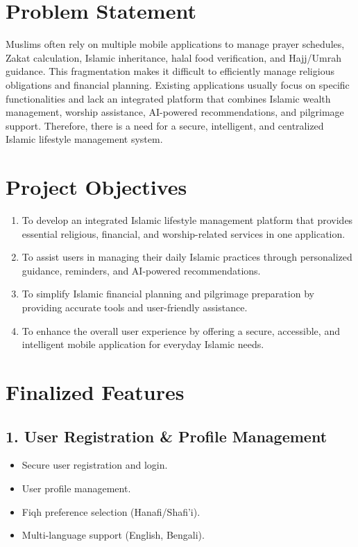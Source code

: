\documentclass[12pt,a4paper]{article}
\begin{document}
\tableofcontents
\newpage

\section{Problem Statement}

Muslims often rely on multiple mobile applications to manage prayer schedules, Zakat calculation, Islamic inheritance, halal food verification, and Hajj/Umrah guidance. This fragmentation makes it difficult to efficiently manage religious obligations and financial planning. Existing applications usually focus on specific functionalities and lack an integrated platform that combines Islamic wealth management, worship assistance, AI-powered recommendations, and pilgrimage support. Therefore, there is a need for a secure, intelligent, and centralized Islamic lifestyle management system.

\section{Project Objectives}

\begin{enumerate}[leftmargin=2em, label=\arabic*.]
  \item To develop an integrated Islamic lifestyle management platform that provides essential religious, financial, and worship-related services in one application. 
  \item To assist users in managing their daily Islamic practices through personalized guidance, reminders, and AI-powered recommendations. 
  \item To simplify Islamic financial planning and pilgrimage preparation by providing accurate tools and user-friendly assistance. 
  \item To enhance the overall user experience by offering a secure, accessible, and intelligent mobile application for everyday Islamic needs.
\end{enumerate}

\section{Finalized Features}

\subsection*{1. User Registration \& Profile Management}
\begin{itemize}[leftmargin=2em, label=\textbullet, itemsep=3pt]
  \item Secure user registration and login.
  \item User profile management.
  \item Fiqh preference selection (Hanafi/Shafi'i).
  \item Multi-language support (English, Bengali).
\end{itemize}
\end{document}
